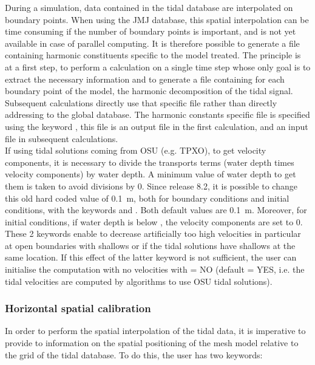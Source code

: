During a simulation, data contained in the tidal database are interpolated on
boundary points. When using the JMJ database, this spatial interpolation can
be time consuming if the number of boundary points is important, and is not yet
available in case of parallel computing. It is therefore possible to generate a
file containing harmonic constituents specific to the model treated. The
principle is at a first step, to perform a calculation on a single time step
whose only goal is to extract the necessary information and to generate a file
containing for each boundary point of the model, the harmonic decomposition of
the tidal signal. Subsequent calculations directly use that specific file
rather than directly addressing to the global database. The harmonic constants
specific file is specified using the keyword ,
this file is an output file in the first calculation, and an input file in
subsequent calculations.
\\

If using tidal solutions coming from OSU (e.g. TPXO), to get velocity
components, it is necessary to divide the transports terms
(water depth times velocity components) by water depth.
A minimum value of water depth to get them is taken to avoid divisions by 0.
Since release 8.2, it is possible to change this old hard coded value of 0.1~m,
both for boundary conditions and initial conditions, with the keywords
 and
.
Both default values are 0.1~m.
Moreover, for initial conditions, if water depth is below
,
the velocity components are set to 0.
These 2 keywords enable to decrease artificially too high velocities
in particular at open boundaries with shallows or if the tidal solutions
have shallows at the same location.
If this effect of the latter keyword is not sufficient,
the user can initialise the computation with no velocities with
 = NO (default = YES, i.e. the
tidal velocities are computed by algorithms to use OSU tidal solutions).


\subsubsection{Horizontal spatial calibration}

In order to perform the spatial interpolation of the tidal data, it is
imperative to provide to  information on the spatial positioning of
the mesh model relative to the grid of the tidal database. To do this, the user
has two keywords:

